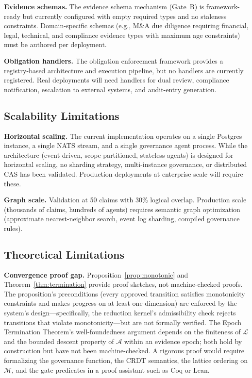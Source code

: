 \documentclass[11pt]{article}
\begin{document}
\textbf{Evidence schemas.} The evidence schema mechanism (Gate~B) is framework-ready but currently configured with empty required types and no staleness constraints. Domain-specific schemas (e.g., M\&A due diligence requiring financial, legal, technical, and compliance evidence types with maximum age constraints) must be authored per deployment.

\textbf{Obligation handlers.} The obligation enforcement framework provides a registry-based architecture and execution pipeline, but no handlers are currently registered. Real deployments will need handlers for dual review, compliance notification, escalation to external systems, and audit-entry generation.

\subsection{Scalability Limitations}

\textbf{Horizontal scaling.} The current implementation operates on a single Postgres instance, a single NATS stream, and a single governance agent process. While the architecture (event-driven, scope-partitioned, stateless agents) is designed for horizontal scaling, no sharding strategy, multi-instance governance, or distributed CAS has been validated. Production deployments at enterprise scale will require these.

\textbf{Graph scale.} Validation at 50 claims with 30\% logical overlap. Production scale (thousands of claims, hundreds of agents) requires semantic graph optimization (approximate nearest-neighbor search, event log sharding, compiled governance rules).

\subsection{Theoretical Limitations}

\textbf{Convergence proof gap.} Proposition~\ref{prop:monotonic} and Theorem~\ref{thm:termination} provide proof sketches, not machine-checked proofs. The proposition's preconditions (every approved transition satisfies monotonicity constraints and makes progress on at least one dimension) are enforced by the system's design---specifically, the reduction kernel's admissibility check rejects transitions that violate monotonicity---but are not formally verified. The Epoch Termination Theorem's well-foundedness argument depends on the finiteness of $\mathcal{L}$ and the bounded descent property of $\mathcal{A}$ within an evidence epoch; both hold by construction but have not been machine-checked. A rigorous proof would require formalizing the governance function, the CRDT semantics, the lattice ordering on $\mathcal{M}$, and the gate predicates in a proof assistant such as Coq or Lean.
\end{document}
